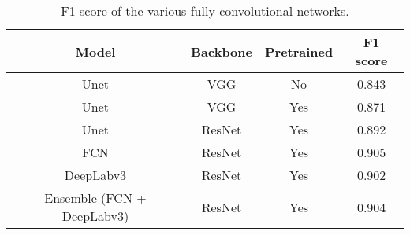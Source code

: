 \begin{table}[h]
    \centering
    \begin{tabular}{|c|c|c|c|}
        \hline
        \textbf{Model} & \textbf{Backbone} & \textbf{Pretrained} & \textbf{F1 score} \\
        \hline
        \hline
        Unet & VGG & No & 0.843 \\
        \hline
        Unet & VGG & Yes & 0.871 \\
        \hline
        Unet & ResNet & Yes & 0.892 \\
        \hline
        FCN & ResNet & Yes & 0.905 \\
        \hline
        DeepLabv3 & ResNet & Yes & 0.902 \\
        \hline
        Ensemble (FCN + DeepLabv3) & ResNet & Yes & 0.904 \\
        \hline
    \end{tabular}
    \caption{F1 score of the various fully convolutional networks.}
    \label{tab:fcn-results}
\end{table}

